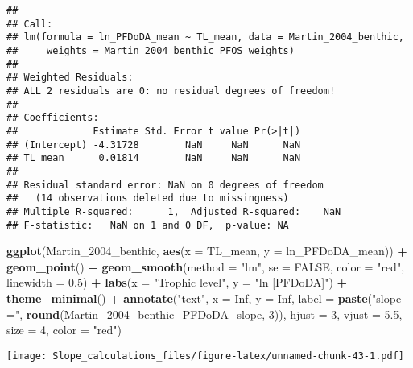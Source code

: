 \documentclass[
]{article}
\newenvironment{Shaded}{\begin{snugshade}}{\end{snugshade}}
\newcommand{\AttributeTok}[1]{\textcolor[rgb]{0.13,0.29,0.53}{#1}}
\newcommand{\ConstantTok}[1]{\textcolor[rgb]{0.56,0.35,0.01}{#1}}
\newcommand{\DecValTok}[1]{\textcolor[rgb]{0.00,0.00,0.81}{#1}}
\newcommand{\FloatTok}[1]{\textcolor[rgb]{0.00,0.00,0.81}{#1}}
\newcommand{\FunctionTok}[1]{\textcolor[rgb]{0.13,0.29,0.53}{\textbf{#1}}}
\newcommand{\NormalTok}[1]{#1}
\newcommand{\SpecialCharTok}[1]{\textcolor[rgb]{0.81,0.36,0.00}{\textbf{#1}}}
\newcommand{\StringTok}[1]{\textcolor[rgb]{0.31,0.60,0.02}{#1}}
\begin{document}
\begin{verbatim}
## 
## Call:
## lm(formula = ln_PFDoDA_mean ~ TL_mean, data = Martin_2004_benthic, 
##     weights = Martin_2004_benthic_PFOS_weights)
## 
## Weighted Residuals:
## ALL 2 residuals are 0: no residual degrees of freedom!
## 
## Coefficients:
##             Estimate Std. Error t value Pr(>|t|)
## (Intercept) -4.31728        NaN     NaN      NaN
## TL_mean      0.01814        NaN     NaN      NaN
## 
## Residual standard error: NaN on 0 degrees of freedom
##   (14 observations deleted due to missingness)
## Multiple R-squared:      1,  Adjusted R-squared:    NaN 
## F-statistic:   NaN on 1 and 0 DF,  p-value: NA
\end{verbatim}

\begin{Shaded}
\begin{Highlighting}[]
\FunctionTok{ggplot}\NormalTok{(Martin\_2004\_benthic, }\FunctionTok{aes}\NormalTok{(}\AttributeTok{x =}\NormalTok{ TL\_mean, }\AttributeTok{y =}\NormalTok{ ln\_PFDoDA\_mean)) }\SpecialCharTok{+}
  \FunctionTok{geom\_point}\NormalTok{() }\SpecialCharTok{+}
  \FunctionTok{geom\_smooth}\NormalTok{(}\AttributeTok{method =} \StringTok{"lm"}\NormalTok{, }\AttributeTok{se =} \ConstantTok{FALSE}\NormalTok{, }\AttributeTok{color =} \StringTok{"red"}\NormalTok{, }\AttributeTok{linewidth =} \FloatTok{0.5}\NormalTok{) }\SpecialCharTok{+}
  \FunctionTok{labs}\NormalTok{(}\AttributeTok{x =} \StringTok{"Trophic level"}\NormalTok{,}
       \AttributeTok{y =} \StringTok{"ln [PFDoDA]"}\NormalTok{) }\SpecialCharTok{+}
  \FunctionTok{theme\_minimal}\NormalTok{() }\SpecialCharTok{+}
  \FunctionTok{annotate}\NormalTok{(}\StringTok{"text"}\NormalTok{, }\AttributeTok{x =} \ConstantTok{Inf}\NormalTok{, }\AttributeTok{y =} \ConstantTok{Inf}\NormalTok{, }\AttributeTok{label =} \FunctionTok{paste}\NormalTok{(}\StringTok{"slope ="}\NormalTok{, }\FunctionTok{round}\NormalTok{(Martin\_2004\_benthic\_PFDoDA\_slope, }\DecValTok{3}\NormalTok{)), }
           \AttributeTok{hjust =} \DecValTok{3}\NormalTok{, }\AttributeTok{vjust =} \FloatTok{5.5}\NormalTok{, }\AttributeTok{size =} \DecValTok{4}\NormalTok{, }\AttributeTok{color =} \StringTok{"red"}\NormalTok{)}
\end{Highlighting}
\end{Shaded}

\texttt{[image: Slope\_calculations\_files/figure-latex/unnamed-chunk-43-1.pdf]}
\end{document}
